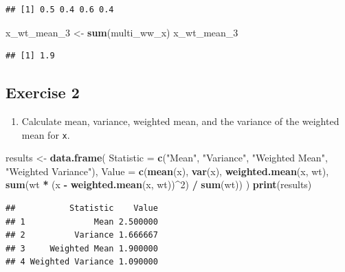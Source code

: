 \documentclass[
  doc]{apa6}
\newenvironment{Shaded}{\begin{snugshade}}{\end{snugshade}}
\newcommand{\AttributeTok}[1]{\textcolor[rgb]{0.13,0.29,0.53}{#1}}
\newcommand{\DecValTok}[1]{\textcolor[rgb]{0.00,0.00,0.81}{#1}}
\newcommand{\FunctionTok}[1]{\textcolor[rgb]{0.13,0.29,0.53}{\textbf{#1}}}
\newcommand{\NormalTok}[1]{#1}
\newcommand{\OtherTok}[1]{\textcolor[rgb]{0.56,0.35,0.01}{#1}}
\newcommand{\SpecialCharTok}[1]{\textcolor[rgb]{0.81,0.36,0.00}{\textbf{#1}}}
\newcommand{\StringTok}[1]{\textcolor[rgb]{0.31,0.60,0.02}{#1}}
\providecommand{\tightlist}{%
  \setlength{\itemsep}{0pt}\setlength{\parskip}{0pt}}
\begin{document}
\begin{verbatim}
## [1] 0.5 0.4 0.6 0.4
\end{verbatim}

\begin{Shaded}
\begin{Highlighting}[]
\NormalTok{x\_wt\_mean\_3 }\OtherTok{\textless{}{-}} \FunctionTok{sum}\NormalTok{(multi\_ww\_x)}
\NormalTok{x\_wt\_mean\_3}
\end{Highlighting}
\end{Shaded}

\begin{verbatim}
## [1] 1.9
\end{verbatim}

\newpage

\hypertarget{exercise-2}{%
\subsection{Exercise 2}\label{exercise-2}}

\begin{enumerate}
\def\labelenumi{\alph{enumi})}
\tightlist
\item
  Calculate mean, variance, weighted mean, and the variance of the weighted mean for \texttt{x}.
\end{enumerate}

\begin{Shaded}
\begin{Highlighting}[]
\NormalTok{results }\OtherTok{\textless{}{-}} \FunctionTok{data.frame}\NormalTok{(}
  \AttributeTok{Statistic =} \FunctionTok{c}\NormalTok{(}\StringTok{"Mean"}\NormalTok{, }\StringTok{"Variance"}\NormalTok{, }\StringTok{"Weighted Mean"}\NormalTok{, }\StringTok{"Weighted Variance"}\NormalTok{),}
  \AttributeTok{Value =} \FunctionTok{c}\NormalTok{(}\FunctionTok{mean}\NormalTok{(x), }\FunctionTok{var}\NormalTok{(x), }\FunctionTok{weighted.mean}\NormalTok{(x, wt), }\FunctionTok{sum}\NormalTok{(wt }\SpecialCharTok{*}\NormalTok{ (x }\SpecialCharTok{{-}} \FunctionTok{weighted.mean}\NormalTok{(x, wt))}\SpecialCharTok{\^{}}\DecValTok{2}\NormalTok{) }\SpecialCharTok{/} \FunctionTok{sum}\NormalTok{(wt))}
\NormalTok{)}
\FunctionTok{print}\NormalTok{(results)}
\end{Highlighting}
\end{Shaded}

\begin{verbatim}
##           Statistic    Value
## 1              Mean 2.500000
## 2          Variance 1.666667
## 3     Weighted Mean 1.900000
## 4 Weighted Variance 1.090000
\end{verbatim}
\end{document}
